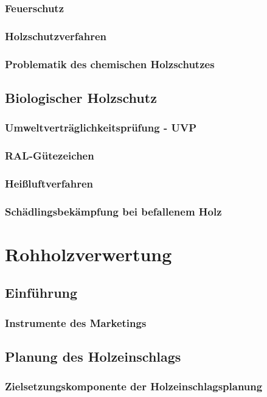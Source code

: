 \documentclass[12pt]{article}
\begin{document}
\subsubsection{Feuerschutz}
\subsubsection{Holzschutzverfahren}
\subsubsection{Problematik des chemischen Holzschutzes}
\subsection{Biologischer Holzschutz}
\subsubsection{Umweltverträglichkeitsprüfung - UVP}
\subsubsection{RAL-Gütezeichen}
\subsubsection{Heißluftverfahren}
\subsubsection{Schädlingsbekämpfung bei befallenem Holz}
\section{Rohholzverwertung}
\subsection{Einführung}
\subsubsection{Instrumente des Marketings}
\subsection{Planung des Holzeinschlags}
\subsubsection{Zielsetzungskomponente der Holzeinschlagsplanung}
\end{document}
